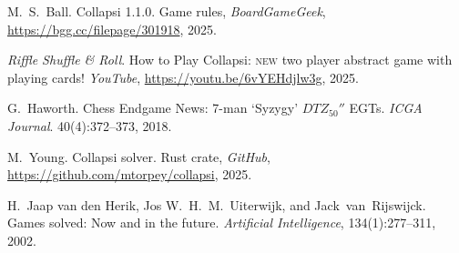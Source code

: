 \documentclass[a4paper, twocolumn]{article}
\begin{document}
\begin{thebibliography}{9}

  M.~S.~Ball.
  Collapsi 1.1.0.
  Game rules,
  \textit{BoardGameGeek},
  \url{https://bgg.cc/filepage/301918},
  2025.

  \textit{Riffle Shuffle \& Roll}.
  How to Play Collapsi:
  \textsc{new} two player abstract game with playing cards!
  \textit{YouTube},
  \url{https://youtu.be/6vYEHdjlw3g},
  2025.

  G.~Haworth.
  Chess Endgame News: 7-man `Syzygy' $DTZ_{50}''$ EGTs.
  \textit{ICGA Journal}. 40(4):372--373,
  2018.

  M.~Young.
  Collapsi solver.
  Rust crate,
  \textit{GitHub},
  \url{https://github.com/mtorpey/collapsi},
  2025.

  H.~Jaap van den Herik, Jos W.~H.~M.~Uiterwijk, and Jack~van~Rijswijck.
  Games solved: Now and in the future.
  \textit{Artificial Intelligence}, 134(1):277--311,
  2002.

\end{thebibliography}
\end{document}
